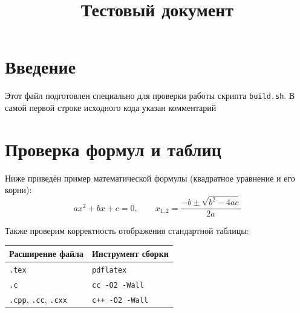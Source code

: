 \documentclass[11pt, a4paper]{article}
\title{Тестовый документ}
\author{}
\date{}
\begin{document}
\maketitle

\section{Введение}
Этот файл подготовлен специально для проверки работы скрипта \texttt{build.sh}. В самой первой строке исходного кода указан комментарий

\section{Проверка формул и таблиц}
Ниже приведён пример математической формулы (квадратное уравнение и его корни):
\[
ax^2 + bx + c = 0, \qquad x_{1,2} = \frac{-b \pm \sqrt{b^2 - 4ac}}{2a}
\]

Также проверим корректность отображения стандартной таблицы:

\begin{center}
\begin{tabular}{ll}
\toprule
\textbf{Расширение файла} & \textbf{Инструмент сборки} \\
\midrule
\texttt{.tex} & \texttt{pdflatex} \\
\texttt{.c} & \texttt{cc -O2 -Wall} \\
\texttt{.cpp}, \texttt{.cc}, \texttt{.cxx} & \texttt{c++ -O2 -Wall} \\
\bottomrule
\end{tabular}
\end{center}
\end{document}
